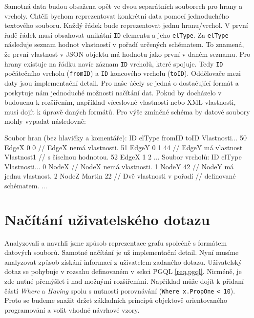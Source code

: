 Samotná data budou obsažena opět ve dvou separátních souborech pro hrany a vrcholy.
Chtěli bychom reprezentovat konkrétní data pomocí jednoduchého textového souboru.
Každý řádek bude reprezentovat jednu hranu/vrchol.
V první řadě řádek musí obsahovat unikátní \verb+ID+ elementu a jeho \verb+elType+. 
Za \verb+elType+ následuje seznam hodnot vlastností v pořadí určených schématem.
To znamená, že první vlastnost v JSON objektu má hodnotu jako první v daném seznamu.
Pro hrany existuje na řádku navíc záznam \verb+ID+ vrcholů, které spojuje.
Tedy \texttt{ID} počátečního vrcholu (\texttt{fromID}) a \texttt{ID} koncového vrcholu (\texttt{toID}). 
Oddělovače mezi daty jsou implementační detail.
Pro naše účely se jedná o dostačující formát a poskytuje nám jednoduché možnosti načítání dat.
Pokud by docházelo v budoucnu k rozšířením, například víceslovné vlastnosti nebo XML vlastnosti, musí dojít k úpravě daných formátů.
Pro výše zmíněné schéma by datové soubory mohly vypadat následovně:
\begin{code}
Soubor hran (bez hlavičky a komentáře):
ID elType fromID toID Vlastnosti... 
50 EdgeX 0 0    // EdgeX nemá vlastnosti.
51 EdgeY 0 1 44 // EdgeY má vlastnost Vlastnost1
                // s číselnou hodnotou.
52 EdgeX 1 2   
...
Soubor vrcholů:
ID elType Vlastnosti...
0 NodeX    // NodeX nemá vlastnosti.
1 NodeY 42 // NodeY má jednu vlastnost.
2 NodeZ Martin 22 // Dvě vlastnosti v pořadí
                  // definované schématem.
...
\end{code}

\section{Načítání uživatelského dotazu} \label{anal.parsing}

Analyzovali a navrhli jsme způsob reprezentace grafu společně s formátem datových souborů.
Samotné načítání je už implementační detail.
Nyní musíme analyzovat způsob získání informací z uživatelem zadaného dotazu. 
Uživatelský dotaz se pohybuje v rozsahu definovaném v sekci PGQL \ref{req.pgql}.
Nicméně, je zde nutné přemýšlet i nad možnými rozšířeními.
Například může dojít k přidaní částí \textit{Where} a \textit{Having} spolu s nutností porovnávání (\texttt{Where x.PropOne} \texttt{< 10}).
Proto se budeme snažit držet základních principů objektově orientovaného programování a volit vhodné návrhové vzory.

